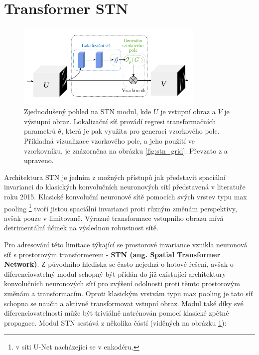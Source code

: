 \section{Transformer STN}
\label{sec:Chapter28}

\begin{figure}[ht]
\centering
\includegraphics[width=0.8\textwidth,keepaspectratio]{Figures/stn/stn_module.pdf}
\caption[Zjednodušený pohled na STN modul]
{Zjednodušený pohled na STN modul, kde $U$ je vstupní obraz a $V$ je výstupní obraz. Lokalizační síť provádí regresi transformačních parametrů $\theta$, která je pak využita pro generaci vzorkového pole. Příkladná vizualizace vzorkového pole, a jeho použití ve vzorkovníku, je znázorněna na obrázku \ref{fig:stn_grid}. Převzato z \cite{stn} a upraveno. }
\label{fig:stn_overview}
\end{figure}

Architektura STN je jedním z možných přístupů jak představit spaciální invarianci do klasických konvolučních neuronových sítí představená v literatuře \cite{stn} roku 2015. Klasické konvoluční neuronové sítě pomocích svých vrstev typu max pooling \footnote{v síti U-Net nacházející se v enkodéru.} tvoří jistou spaciální invarianci proti různým změnám perspektivy, avšak pouze v limitovaně. Výrazné transformace vstupního obrazu mívá detrimentální účinek na výslednou robustnost sítě.

Pro adresování této limitace týkající se prostorové invariance vznikla neuronová síť s prostorovým transformerem - \textbf{STN (ang. Spatial Transformer Network)}. Z původního hlediska se často nejedná o hotové řešení, avšak o diferenciovatelný modul schopný být přidán do již existující architektury konvolučních neuronových sítí pro zvýšení odolnosti proti těmto prostorovým změnám a transformacím. Oproti klasickým vrstvám typu max pooling je tato síť schopna se naučit a aktivně transformovat vstupní obraz. Modul také díky své diferenciovatelnosti může být triviálně natrénován pomocí klasické zpětné propagace. Modul STN sestává z několika částí (viděných na obrázku \ref{fig:stn_overview}):

